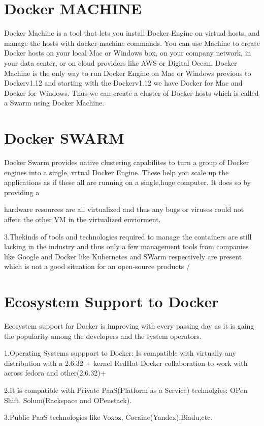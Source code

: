 \documentclass[9pt,twocolumn,twoside]{styles/osajnl}
\begin{document}
\section{Docker MACHINE}

\cite{www-docker-machine}Docker Machine is a tool that lets you install 
Docker Engine on virtual hosts, and manage the hosts with docker-machine 
commands. You can use Machine to create Docker hosts on your local Mac 
or Windows box, on your company network, in your data center, or on 
cloud providers like AWS or Digital Ocean. Docker Machine is the only 
way to run Docker Engine on Mac or Windows previous to Dockerv1.12 
and starting with the Dockerv1.12 we have Docker for Mac and Docker for 
Windows. Thus we can create a cluster of Docker hosts which is called
a Swarm using Docker Machine.

\section{Docker SWARM}
\cite{www-docker-swarm}Docker Swarm provides native clustering 
capabilites to turn a group of Docker engines into a single, vrtual 
Docker Engine. These help you scale up the applications as if these all 
are running on a single,huge computer. It does so by providing a 

hardware resources are all virtualized and thus any bugs or viruses
could not affetc the other VM in the virtualized enviorment.

3.Thekinds of tools and technologies required to manage the containers
are still lacking in the industry and thus only a few management tools
from companies like Google and Docker like Kubernetes and SWarm
respectively are present which is not a good situation for an
open-source products
/
\section{Ecosystem Support to Docker}
Ecosystem support for Docker is improving with every passing day as it
is gaing the popularity among the developers and the system operators.

1.Operating Systems suppport to Docker: Is compatible with virtually
any distribution with a 2.6.32 + kernel RedHat Docker collaboration to
work with across fedora and other(2.6.32)+

2.It is compatible with Private PaaS(Platform as a Service)
technolgies: OPen Shift, Solum(Rackspace and OPenstack).

3.Public PaaS technologies like Voxoz, Cocaine(Yandex),Biadu,etc.
\end{document}

